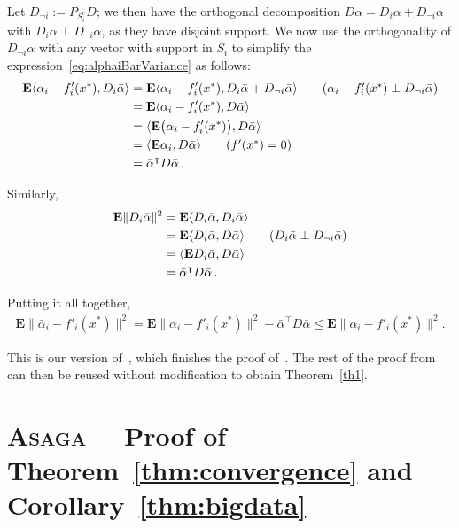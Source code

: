 \documentclass[twoside, 11pt]{article}
\newcommand{\Econd}{\mathbf{E}}
\newcommand{\ASAGA}{\textsc{Asaga}}
\begin{document}
	Let $D_{\neg i} := P_{S_i^c} D$; we then have the orthogonal decomposition $D \alpha = D_i \alpha + D_{\neg i} \alpha$ with $D_i \alpha \perp D_{\neg i} \alpha$, as they have disjoint support. We now use the orthogonality of $D_{\neg i} \alpha$ with any vector with support in $S_i$ to simplify the expression~\eqref{eq:alphaiBarVariance} as follows:
	\begin{align}
	\Econd \langle \alpha_i - f'_i(x^*), D_i\bar \alpha \rangle
	&= \Econd \langle \alpha_i - f'_i(x^*), D_i \bar \alpha + D_{\neg i} \bar \alpha \rangle
	\tag*{$(\alpha_i - f'_i(x^*) \perp D_{\neg i} \bar \alpha)$}
	\nonumber \\
	&= \Econd \langle \alpha_i - f'_i(x^*), D \bar \alpha \rangle
	\nonumber \\
	&= \langle \Econd \big(\alpha_i - f'_i(x^*)\big), D \bar \alpha \rangle
	\nonumber \\
	&= \langle \Econd \alpha_i, D \bar \alpha \rangle
	\tag*{($f'(x^*) = 0$)}
	\nonumber \\
	&=\bar \alpha^\intercal D \bar \alpha \,  .
	\end{align}

	Similarly,
	\begin{align}
	\Econd \|D_i\bar \alpha\|^2
	&= \Econd\langle D_i\bar \alpha, D_i\bar \alpha \rangle
	\nonumber \\
	&= \Econd\langle D_i\bar \alpha, D \bar \alpha \rangle
	\tag*{($D_i \bar \alpha \perp D_{\neg i} \bar \alpha$)}
	\nonumber \\
	&= \langle \Econd D_i\bar \alpha, D \bar \alpha \rangle
	\nonumber \\
	&= \bar \alpha^\intercal D \bar \alpha  \, .
	\end{align}

	Putting it all together,
	\begin{align}
	\Econd \|\bar \alpha_i -f'_i(x^*)\|^2
	= \Econd \|\alpha_i -f'_i(x^*)\|^2 - \bar \alpha^\intercal D \bar \alpha
	\leq \Econd \|\alpha_i -f'_i(x^*)\|^2 .
	\end{align}

	This is our version of~\citet[Equation 9]{qsaga}, which finishes the proof of~\citet[Lemma~1]{qsaga}.
	The rest of the proof from~\citet{qsaga} can then be reused without modification to obtain Theorem~\ref{th1}.
	\hfill\BlackBox

\section{\ASAGA\ -- Proof of Theorem~\ref{thm:convergence} and Corollary~\ref{thm:bigdata}}\label{apxB}
\end{document}
